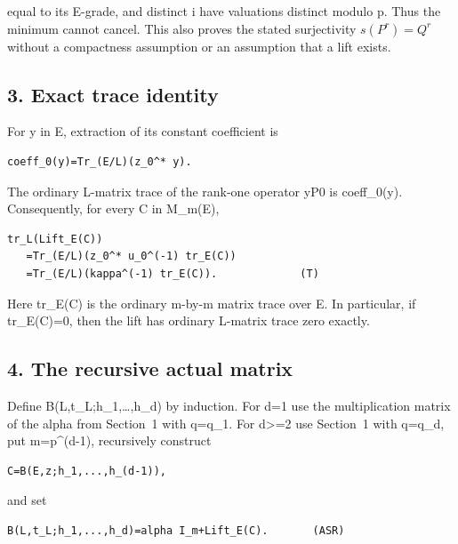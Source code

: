 equal to its E-grade, and distinct i have valuations distinct modulo p.
Thus the minimum cannot cancel. This also proves the stated surjectivity
\(s(P^r)=Q^r\) without a compactness assumption or an assumption that a lift exists.

\hypertarget{odd_tower-exact-trace-identity}{%
\subsection{3. Exact trace identity}\label{odd_tower-exact-trace-identity}}

For y in E, extraction of its constant coefficient is

\begin{Verbatim}[fontsize=\small,breaklines=true,breakanywhere=true]
coeff_0(y)=Tr_(E/L)(z_0^* y).
\end{Verbatim}

The ordinary L-matrix trace of the rank-one operator yP0 is coeff\_0(y).
Consequently, for every C in M\_m(E),

\begin{Verbatim}[fontsize=\small,breaklines=true,breakanywhere=true]
tr_L(Lift_E(C))
   =Tr_(E/L)(z_0^* u_0^(-1) tr_E(C))
   =Tr_(E/L)(kappa^(-1) tr_E(C)).             (T)
\end{Verbatim}

Here tr\_E(C) is the ordinary m-by-m matrix trace over E. In particular,
if tr\_E(C)=0, then the lift has ordinary L-matrix trace zero exactly.

\hypertarget{odd_tower-the-recursive-actual-matrix}{%
\subsection{4. The recursive actual
matrix}\label{odd_tower-the-recursive-actual-matrix}}

Define B(L,t\_L;h\_1,\ldots,h\_d) by induction. For d=1 use the
multiplication matrix of the alpha from Section~1 with q=q\_1. For
d\textgreater=2 use Section~1 with q=q\_d, put m=p\^{}(d-1), recursively
construct

\begin{Verbatim}[fontsize=\small,breaklines=true,breakanywhere=true]
C=B(E,z;h_1,...,h_(d-1)),
\end{Verbatim}

and set

\begin{Verbatim}[fontsize=\small,breaklines=true,breakanywhere=true]
B(L,t_L;h_1,...,h_d)=alpha I_m+Lift_E(C).       (ASR)
\end{Verbatim}

